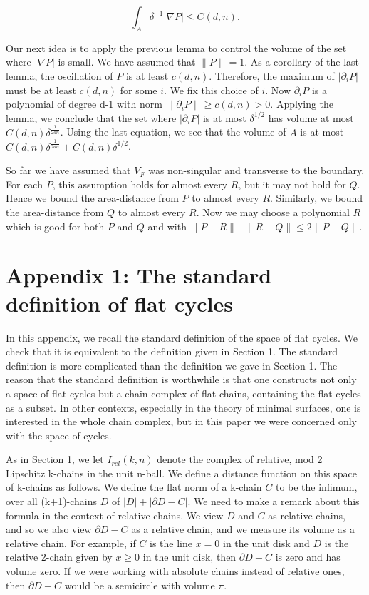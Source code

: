 \documentclass{amsart}
\newtheorem*{Theorem 1}{Theorem 1}
\newtheorem*{Theorem 2}{Theorem 2}
\newtheorem*{Theorem 1A}{Theorem 1A}
\newtheorem*{Theorem 2A}{Theorem 2A}
\newtheorem*{vanishing lemma}{Vanishing Lemma}
\numberwithin{equation}{section}
\begin{document}
$$\int_A \delta^{-1} |\nabla P| \le C(d,n).$$

Our next idea is to apply the previous lemma to control the
volume of the set where $|\nabla P|$ is small. We have assumed
that $\| P \| = 1$.  As a corollary of the last lemma, the
oscillation of $P$ is at least $c(d,n)$.  Therefore, the maximum
of $|\partial_i P|$ must be at least $c(d,n)$ for some $i$.  We
fix this choice of $i$.  Now $\partial_i P$ is a polynomial of
degree d-1 with norm $\| \partial_i P \| \ge c(d,n) > 0$. 
Applying the lemma, we conclude that the set where $|\partial_i
P|$ is at most $\delta^{1/2}$ has volume at most $C(d,n)
\delta^{\frac{1}{2dn}}$.  Using the last equation, we see that
the volume of $A$ is at most $C(d,n) \delta^{\frac{1}{2dn}} +
C(d,n) \delta^{1/2}$.

So far we have assumed that $V_F$ was non-singular and transverse
to the boundary.  For each $P$, this assumption holds
for almost every $R$, but it may not hold for $Q$.  Hence we
bound the area-distance from $P$ to almost every $R$.  Similarly,
we bound the area-distance from $Q$ to almost every $R$.  Now we
may choose a polynomial $R$ which is good for both $P$ and $Q$
and with $\| P - R \| + \|R - Q \| \le 2 \| P - Q \|$. \endproof



\section{Appendix 1: The standard definition of flat cycles}

In this appendix, we recall the standard definition of the space
of flat cycles.  We check that it is equivalent to the definition
given in Section 1.  The standard definition is more complicated
than the definition we gave in Section 1.
The reason that the standard definition is worthwhile is
that one constructs not only a space of flat cycles but a chain
complex of flat chains, containing the flat cycles as a subset. 
In other contexts, especially in the theory of minimal surfaces,
one is interested in the whole chain complex, but in this paper
we were concerned only with the space of cycles.

As in Section 1, we let $I_{rel}(k,n)$ denote the complex of
relative, mod 2 Lipschitz k-chains in the unit n-ball.  We define
a distance function on this space of k-chains as follows.  We
define the flat norm of a k-chain $C$ to be the infimum, over all
(k+1)-chains $D$ of $|D| + |\partial D - C|$.  We need to make
a remark about this formula in the context of relative
chains.  We view $D$ and $C$ as relative chains, and so we also
view $\partial D - C$ as a relative chain, and we measure its
volume as a relative chain.  For example, if $C$ is the line
$x=0$ in the unit disk and $D$ is the relative 2-chain given by
$x \ge 0$ in the unit disk, then $\partial D - C$ is zero and
has volume zero.  If we were working with absolute chains
instead of relative ones, then $\partial D - C$ would be a
semicircle with volume $\pi$.
\end{document}
